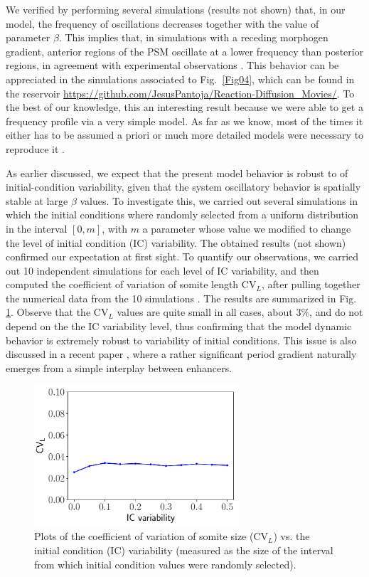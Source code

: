 \documentclass[%
 preprint,
 aip, 
 amsmath,amssymb,
]{revtex4-2}
\begin{document}
We verified by performing several simulations (results not shown) that, in our model, the frequency of oscillations decreases together with the value of parameter $\beta$. This implies that, in simulations  with a receding morphogen gradient, anterior regions of the PSM oscillate at a lower frequency than posterior regions, in agreement with experimental observations \cite{Goldbeter2008, Hester2011}. This behavior can be appreciated in the simulations associated to Fig.~\ref{Fig04}, which can be found in the reservoir \url{https://github.com/JesusPantoja/Reaction-Diffusion_Movies/}. To the best of our knowledge, this an interesting result because we were able to get a frequency profile via a very simple model. As far as we know, most of the times it either has to be assumed a priori \cite{Morelli2009} or much more detailed models were necessary to reproduce it \cite{Hester2011}.
	
As earlier discussed, we expect that the present model behavior is robust to  of initial-condition variability, given that the system  oscillatory behavior is spatially stable at large $\beta$ values. To investigate this, we carried out several simulations in which the initial conditions where randomly selected from a uniform distribution in the interval $[0, m]$, with $m$ a parameter whose value we modified to change the level of initial condition (IC)  variability. The obtained results (not shown) confirmed our expectation at first sight. To quantify our observations, we carried out 10 independent simulations for each level of IC variability, and then computed the coefficient of variation of somite length $\text{CV}_L$, after pulling together the numerical data from the 10 simulations . The results are summarized in Fig. \ref{Fig06_1}. Observe that the $\text{CV}_L$ values are quite small in all cases, about 3\%, and do not depend on the the IC variability level, thus confirming that the model dynamic behavior is extremely robust to variability of initial conditions. This issue is also discussed in a recent paper \cite{JutrasDub2020}, where a rather significant period gradient naturally emerges from a simple interplay between enhancers.

\begin{figure}
	\centering
	\includegraphics[width=3in]{Fig06}
	\caption{Plots of the coefficient of variation of somite size ($\text{CV}_L$) vs. the initial condition (IC) variability (measured as the size of the interval from which initial condition values were randomly selected).}
	\label{Fig06_1}
\end{figure}
\end{document}
